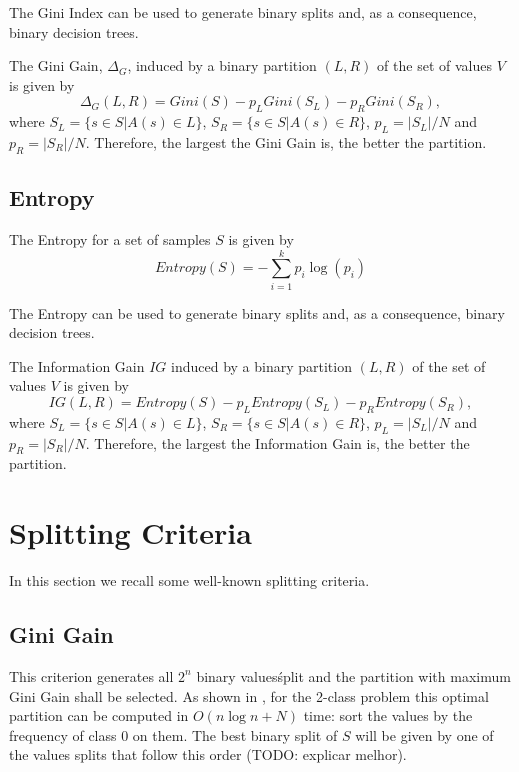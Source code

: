 The Gini Index can be used to generate binary splits
and, as a consequence, binary decision trees.

The Gini Gain, $\Delta_G$, induced by a binary partition $(L,R)$ 
of the set of values $V$ is
given by 
\begin{equation}
 \Delta_G (L,R) = Gini(S) -
p_L Gini(S_L) - p_R Gini(S_R),
\label{eq:Ginigain}
\end{equation}
where $S_L= \{ s \in S | A(s) \in L \}$, $S_R= \{ s \in S | A(s) \in R \}$,
 $p_L=|S_L| /N $
and $p_R=|S_R| /N$. Therefore, the largest the Gini Gain is, the better the partition.

\subsection{Entropy}
The Entropy for a set of samples $S$ is given by 
\begin{equation}
 Entropy(S) =  - \sum_{i=1}^k p_i \log(p_i)
\label{eq:entropy}
\end{equation}

The Entropy can be used to generate binary splits
and, as a consequence, binary decision trees.

The Information Gain $IG$ induced by a binary partition $(L,R)$ 
of the set of values $V$ is given by 
\begin{equation}
 IG(L,R) = Entropy(S) -
p_L Entropy(S_L) - p_R Entropy(S_R),
\label{eq:InformationGain}
\end{equation}
where $S_L= \{ s \in S | A(s) \in L \}$, $S_R= \{ s \in S | A(s) \in R \}$,
 $p_L=|S_L| /N $ and $p_R=|S_R| /N$. Therefore, the largest the Information Gain is, the better the partition.


\section{Splitting Criteria}
In this section we recall some well-known splitting criteria.


\subsection{Gini Gain}
This criterion generates all $2^n$ binary values\' split and the partition with maximum Gini Gain shall be selected.
As shown in \cite{Breiman:84}, for the 2-class problem this optimal partition  
can be computed  in $O(n \log n + N )$ time: sort the values by the frequency of class $0$ on them. The best binary split of $S$ will be given by one of the values splits that follow this order (TODO: explicar melhor).

